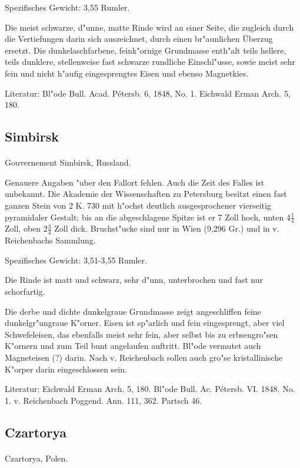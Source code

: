 \documentclass[a4paper, 11pt, oneside]{article}
\begin{document}
Spezifisches Gewicht: 3,55 Rumler.

Die meist schwarze, d"unne, matte Rinde wird an einer Seite, die zugleich durch die Vertiefungen darin sich auszeichnet, durch einen br"aunlichen Überzug ersetzt. Die dunkelaschfarbene, feink"ornige Grundmasse enth"alt teils hellere, teils dunklere, stellenweise fast schwarze rundliche Einschl"usse, sowie meist sehr fein und nicht h"aufig eingesprengtes Eisen und ebenso Magnetkies.

\footnotesize
Literatur: Bl"ode Bull. Acad. Pétersb. 6, 1848, No. 1. Eichwald Erman Arch. 5, 180.

\subsection{Simbirsk}
\normalsize
\paragraph{}
Gouvernement Simbirsk, Russland.

Genauere Angaben "uber den Fallort fehlen. Auch die Zeit des Falles ist unbekannt. Die Akademie der Wissenschaften zu Petersburg besitzt einen fast ganzen Stein von 2 K. 730 mit h"ochst deutlich ausgesprochener vierseitig pyramidaler Gestalt; bis an die abgeschlagene Spitze ist er 7 Zoll hoch, unten $4\frac{1}{4}$ Zoll, oben $2\frac{3}{4}$ Zoll dick. Bruchst"ucke sind nur in Wien (9,296 Gr.) und in v. Reichenbachs Sammlung.

Spezifisches Gewicht: 3,51-3,55 Rumler.

Die Rinde ist matt und schwarz, sehr d"unn, unterbrochen und fast nur schorfartig.

Die derbe und dichte dunkelgraue Grundmasse zeigt angeschliffen feine dunkelgr"ungraue K"orner. Eisen ist sp"arlich und fein eingesprengt, aber viel Schwefeleisen, das ebenfalls meist sehr fein, aber selbst bis zu erbsengro"sen K"ornern und zum Teil bunt angelaufen auftritt. Bl"ode vermutet auch Magneteisen (?) darin. Nach v. Reichenbach sollen auch gro"se kristallinische K"orper darin eingeschlossen sein.

\footnotesize
Literatur: Eichwald Erman Arch. 5, 180. Bl"ode Bull. Ac. Pétersb. VI. 1848. No. 1. v. Reichenbach Poggend. Ann. 111, 362. Partsch 46.

\subsection{Czartorya}
\normalsize
\paragraph{}
Czartorya, Polen.
\end{document}
